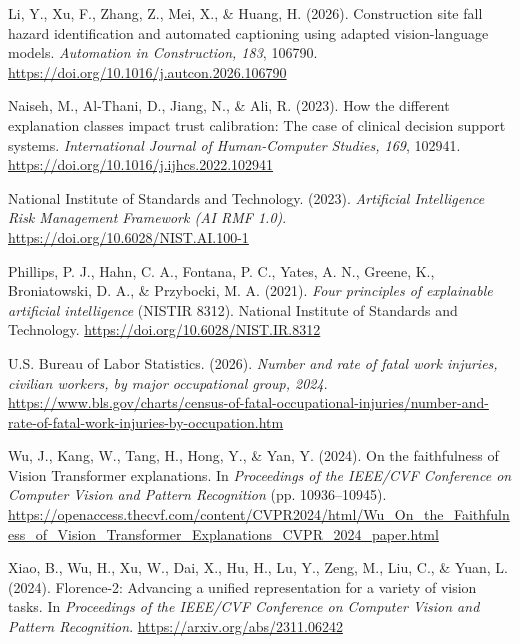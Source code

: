 \documentclass[12pt,letterpaper,twoside]{article}
\newenvironment{apareferences}
  {\begin{list}{}{%
    \setlength{\leftmargin}{0.5in}%
    \setlength{\itemindent}{-0.5in}%
    \setlength{\itemsep}{0pt}%
    \setlength{\parsep}{0pt}%
    \setlength{\topsep}{0pt}}}
  {\end{list}}
\begin{document}
\begin{apareferences}
\item Li, Y., Xu, F., Zhang, Z., Mei, X., \& Huang, H. (2026). Construction site fall hazard identification and automated captioning using adapted vision-language models. \textit{Automation in Construction, 183}, 106790. \url{https://doi.org/10.1016/j.autcon.2026.106790}

\item Naiseh, M., Al-Thani, D., Jiang, N., \& Ali, R. (2023). How the different explanation classes impact trust calibration: The case of clinical decision support systems. \textit{International Journal of Human-Computer Studies, 169}, 102941. \url{https://doi.org/10.1016/j.ijhcs.2022.102941}

\item National Institute of Standards and Technology. (2023). \textit{Artificial Intelligence Risk Management Framework (AI RMF 1.0)}. \url{https://doi.org/10.6028/NIST.AI.100-1}

\item Phillips, P. J., Hahn, C. A., Fontana, P. C., Yates, A. N., Greene, K., Broniatowski, D. A., \& Przybocki, M. A. (2021). \textit{Four principles of explainable artificial intelligence} (NISTIR 8312). National Institute of Standards and Technology. \url{https://doi.org/10.6028/NIST.IR.8312}

\item U.S. Bureau of Labor Statistics. (2026). \textit{Number and rate of fatal work injuries, civilian workers, by major occupational group, 2024}. \url{https://www.bls.gov/charts/census-of-fatal-occupational-injuries/number-and-rate-of-fatal-work-injuries-by-occupation.htm}

\item Wu, J., Kang, W., Tang, H., Hong, Y., \& Yan, Y. (2024). On the faithfulness of Vision Transformer explanations. In \textit{Proceedings of the IEEE/CVF Conference on Computer Vision and Pattern Recognition} (pp. 10936--10945). \url{https://openaccess.thecvf.com/content/CVPR2024/html/Wu_On_the_Faithfulness_of_Vision_Transformer_Explanations_CVPR_2024_paper.html}

\item Xiao, B., Wu, H., Xu, W., Dai, X., Hu, H., Lu, Y., Zeng, M., Liu, C., \& Yuan, L. (2024). Florence-2: Advancing a unified representation for a variety of vision tasks. In \textit{Proceedings of the IEEE/CVF Conference on Computer Vision and Pattern Recognition}. \url{https://arxiv.org/abs/2311.06242}
\end{apareferences}
\end{document}
